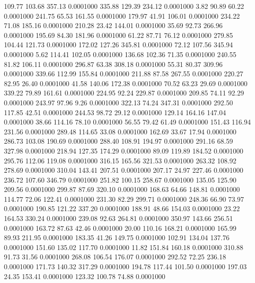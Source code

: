  109.77  103.68  357.13   0.0001000
 335.88  129.39  234.12   0.0001000
   3.82   90.89   60.22   0.0001000
 241.75   65.53  161.55   0.0001000
 179.97   41.91  106.01   0.0001000
 234.22   71.08  185.16   0.0001000
 210.28   23.42  144.01   0.0001000
  35.69   92.73  266.96   0.0001000
 195.69   84.30  181.96   0.0001000
  61.22   87.71   76.12   0.0001000
 279.85  104.44  121.73   0.0001000
 172.02  127.26  345.81   0.0001000
  72.12  107.56  345.94   0.0001000
   5.62  114.41  102.05   0.0001000
 136.68  102.36   71.35   0.0001000
 240.55   81.82  106.11   0.0001000
 296.87   63.38  308.18   0.0001000
  55.31   80.37  309.96   0.0001000
 339.66  112.99  155.84   0.0001000
 211.88   87.58  267.55   0.0001000
 220.27   82.95   26.40   0.0001000
  41.58  140.06  172.38   0.0001000
  70.52   63.23   29.69   0.0001000
 339.22   79.89  161.61   0.0001000
 224.95   92.24  229.87   0.0001000
 209.85   74.11   92.29   0.0001000
 243.97   97.96    9.26   0.0001000
 322.13   74.24  347.31   0.0001000
 292.50  117.85   42.51   0.0001000
 244.53   98.72   29.12   0.0001000
 129.14  164.16  147.04   0.0001000
  38.66  114.16   78.10   0.0001000
  56.55   79.42   61.49   0.0001000
 151.43  116.94  231.56   0.0001000
 289.48  114.65   33.08   0.0001000
 162.69   33.67   17.94   0.0001000
 286.73  103.08  190.69   0.0001000
 288.40  108.91  194.97   0.0001000
 291.16   68.59  327.98   0.0001000
 218.94  127.35  174.29   0.0001000
  89.09  119.89  184.52   0.0001000
 295.76  112.06  119.08   0.0001000
 316.15  165.56  321.53   0.0001000
 263.32  108.92  278.69   0.0001000
 310.04  143.41  207.51   0.0001000
 207.17   24.97  227.46   0.0001000
 236.72  107.60  346.79   0.0001000
 251.82  100.15  258.67   0.0001000
 135.05  125.90  209.56   0.0001000
 299.87   87.69  320.10   0.0001000
 168.63   64.66  148.81   0.0001000
 114.77   72.06  122.41   0.0001000
 231.30   82.29  299.71   0.0001000
 248.36   66.90   73.97   0.0001000
 190.85  121.22  337.20   0.0001000
 188.91   48.66  154.03   0.0001000
  23.22  164.53  330.24   0.0001000
 239.08   92.63  264.81   0.0001000
 350.97  143.66  256.51   0.0001000
 163.72   87.63   42.46   0.0001000
  20.00  110.16  168.21   0.0001000
 165.99   89.93  211.95   0.0001000
 183.35   41.26  149.75   0.0001000
 102.91  134.04  137.76   0.0001000
 151.60  135.02  117.70   0.0001000
  11.82  151.84  160.18   0.0001000
 310.88   91.73   31.56   0.0001000
 268.08  106.54  176.07   0.0001000
 292.52   72.25  236.18   0.0001000
 171.73  140.32  317.29   0.0001000
 194.78  117.44  101.50   0.0001000
 197.03   24.35  153.41   0.0001000
 123.32  100.78   74.88   0.0001000
